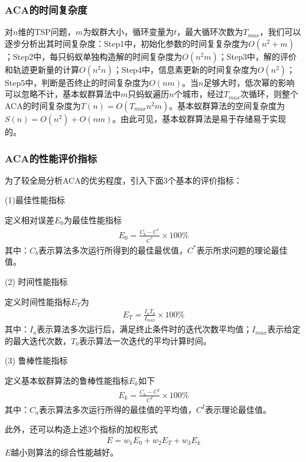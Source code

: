         \subsubsection{ACA的时间复杂度}
            \par
            对$n$维的TSP问题，$m$为蚁群大小，循环变量为$t$，最大循环次数为$T_{max}$，我们可以逐步分析出其时间复杂度：Step1中，初始化参数的时间复复杂度为$O(n^2+m)$；Step2中，每只蚂蚁单独构造解的时间复杂度为$O(n^2m)$；Step3中，解的评价和轨迹更新量的计算$O(n^2n)$；Step4中，信息素更新的时间复杂度为$O(n^2)$；Step5中，判断是否终止的时间复杂度为$O(nm)$。当$n$足够大时，低次幂的影响可以忽略不计，基本蚁群算法中$m$只蚂蚁遍历$n$个城市，经过$T_{max}$次循环，则整个ACA的时间复杂度为$T(n) = O(T_{max}n^2m)$。基本蚁群算法的空间复杂度为$S(n) = O(n^2)+O(nm)$。由此可见，基本蚁群算法是易于存储易于实现的。
        \subsubsection{ACA的性能评价指标}
            \par
            为了较全局分析ACA的优劣程度，引入下面3个基本的评价指标：
            \par
            (1)最佳性能指标
            \par
            定义相对误差$E_0$为最佳性能指标
            \begin{align*}
            E_0 = \frac{C_b - C^*}{C^*}\times 100\%
            \end{align*}
            其中：$C_b$表示算法多次运行所得到的最佳最优值，$C^*$表示所求问题的理论最佳值。
            \par
            (2) 时间性能指标
            \par
            定义时间性能指标$E_T$为
            \begin{align*}
            E_T = \frac{I_a T_0}{I_{max}}\times 100\%
            \end{align*}
            其中：$I_a$表示算法多次运行后，满足终止条件时的迭代次数平均值；$I_{max}$表示给定的最大迭代次数，$T_0$表示算法一次迭代的平均计算时间。
            \par
            (3) 鲁棒性能指标
            \par
            定义基本蚁群算法的鲁棒性能指标$E_k$如下
            \begin{align*}
            E_k = \frac{C_a - C^I}{C^I}\times 100\%
            \end{align*}
            其中：$C_a$表示算法多次运行所得的最佳值的平均值，$C^I$表示理论最佳值。
            \par
            此外，还可以构造上述3个指标的加权形式
            \begin{align*}
            E = w_1E_0+w_2E_T+w_3E_k
            \end{align*}
            $E$越小则算法的综合性能越好。
